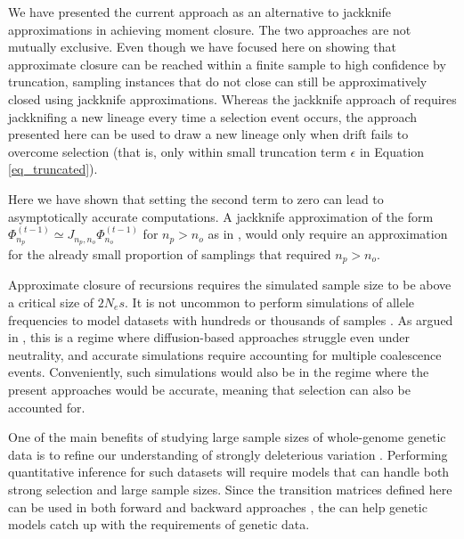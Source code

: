 \documentclass[review,nonatbib]{elsarticle}
\newcommand{\afs}[2]{\Phi_{#1}^{(#2)}}
\begin{document}
We have presented the current approach as an alternative to jackknife approximations in 
achieving moment closure. The two approaches are not mutually exclusive. 
Even though we have focused here on showing that approximate closure can be reached within 
a finite sample to high confidence by truncation, sampling instances that do not close can still be approximatively closed
using jackknife approximations. Whereas the jackknife approach of \cite{JouganousEtAl2017} requires 
jackknifing a new lineage every time a selection event occurs, the approach presented
here can be used to draw a new lineage only when drift fails to overcome selection 
(that is, only within small truncation term $\epsilon$ in Equation \eqref{eq_truncated}).


Here we have shown that setting the second term to zero can lead to asymptotically accurate computations. 
A jackknife approximation of the form $\afs{n_p}{t-1} \simeq J_{n_p, n_o} \afs{n_o}{t-1}$ for $n_p>n_o$ as in \cite{Gravel2016}, 
would only require an approximation for the already small proportion of samplings that required $n_p>n_o.$


Approximate closure of recursions requires the simulated sample size to be above a critical size of $2N_e s.$ 
It is not uncommon to perform simulations of allele frequencies to model datasets with hundreds or 
thousands of samples \citep{Gravel:2011bg, Tennessen:2012ck}. 
 As argued in \citep{BhaskarEtAl2014},  this is a regime where diffusion-based approaches 
 struggle even under neutrality, and accurate simulations require accounting for multiple coalescence events.  
 Conveniently, such simulations would also be in the regime where the present approaches would be accurate, 
 meaning that selection can also be accounted for.

 

One of the main benefits of studying large sample sizes of whole-genome
genetic data is to refine our understanding of strongly deleterious variation \cite{karczewski2020mutational}. Performing 
quantitative inference for such datasets will require models that can handle both strong selection and large sample sizes.  
Since the transition matrices defined here can be used in both forward \citep{JouganousEtAl2017} 
and backward approaches \cite{KammEtAl2017}, the can help genetic models catch up with the requirements of genetic data.
\end{document}
